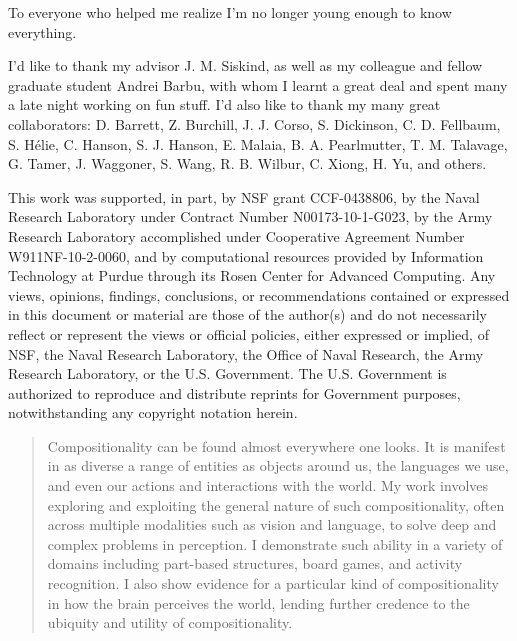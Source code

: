 \begin{dedication}
  To everyone who helped me realize I'm no longer young enough to know
  everything.
\end{dedication}

\begin{acknowledgments}
  I'd like to thank my advisor J. M. Siskind, as well as my colleague and fellow
  graduate student Andrei Barbu, with whom I learnt a great deal and spent
  many a late night working on fun stuff.
  I'd also like to thank my many great collaborators: D. Barrett, Z. Burchill,
  J. J. Corso, S. Dickinson, C. D. Fellbaum, S. H\'{e}lie, C. Hanson,
  S. J. Hanson, E. Malaia, B. A. Pearlmutter, T. M. Talavage, G. Tamer,
  J. Waggoner, S. Wang, R. B. Wilbur, C. Xiong, H. Yu, and others.
  \vfill
  \begin{footnotesize}
    This work was supported, in part, by NSF grant CCF-0438806, by the Naval
    Research Laboratory under Contract Number N00173-10-1-G023, by the Army
    Research Laboratory accomplished under Cooperative Agreement Number
    W911NF-10-2-0060, and by computational resources provided by Information
    Technology at Purdue through its Rosen Center for Advanced Computing.
    Any views, opinions, findings, conclusions, or recommendations contained or
    expressed in this document or material are those of the author(s) and do not
    necessarily reflect or represent the views or official policies, either
    expressed or implied, of NSF, the Naval Research Laboratory, the Office of
    Naval Research, the Army Research Laboratory, or the U.S. Government.
    The U.S. Government is authorized to reproduce and distribute reprints for
    Government purposes, notwithstanding any copyright notation herein.
  \end{footnotesize}
\end{acknowledgments}

\tableofcontents

\listoftables

\listoffigures

\begin{abstract}
  Compositionality can be found almost everywhere one looks. It is manifest in as
  diverse a range of entities as objects around us, the languages we use, and
  even our actions and interactions with the world.
  My work involves exploring and exploiting the general nature of such
  compositionality, often across multiple modalities such as vision and
  language, to solve deep and complex problems in perception.
  I demonstrate such ability in a variety of domains including part-based
  structures, board games, and activity recognition.
  I also show evidence for a particular kind of compositionality in how the
  brain perceives the world, lending further credence to the ubiquity and
  utility of compositionality.
\end{abstract}
